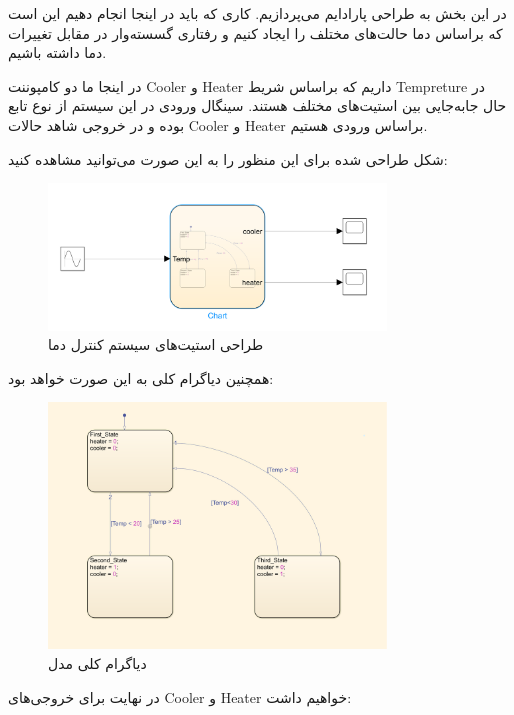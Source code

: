 در این بخش به طراحی پارادایم
می‌پردازیم. کاری که باید در اینجا انجام دهیم این است که براساس دما حالت‌های مختلف را ایجاد کنیم و رفتاری گسسته‌وار در مقابل تغییرات دما داشته باشیم.

در اینجا ما دو کامپوننت
Cooler
و
Heater
داریم که براساس شریط 
Tempreture
در حال جابه‌جایی بین استیت‌های مختلف هستند. سینگال ورودی در این سیستم از نوع تابع
بوده و در خروجی شاهد حالات
Cooler
و
Heater
براساس ورودی هستیم.

شکل
طراحی شده برای این منظور را به این صورت می‌توانید مشاهده کنید:

\begin{figure}[h]
    \centering
    \includegraphics[width = 0.8\textwidth]{commons/image3.png}
    \caption{طراحی استیت‌های سیستم کنترل دما}
\end{figure}

همچنین دیاگرام کلی به این صورت خواهد بود:

\begin{figure}[h]
    \centering
    \includegraphics[width = 0.8\textwidth]{commons/image4.png}
    \caption{دیاگرام کلی مدل}
\end{figure}

\newpage

در نهایت برای خروجی‌های
Cooler
و
Heater
خواهیم داشت:

